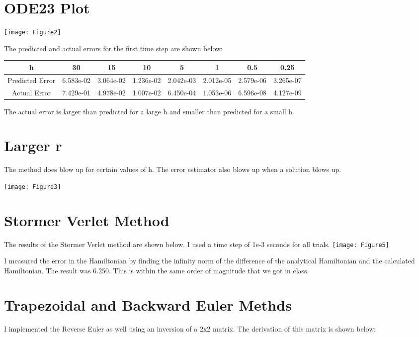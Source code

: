 \documentclass{article}
\begin{document}
\section{ODE23 Plot}

\texttt{[image: Figure2]}

The predicted and actual errors for the first time step are shown below:

\begin{center}
\begin{tabular}{c|c|c|c|c|c|c|c}
 h &  30& 15& 10& 5& 1& 0.5& 0.25\\ \hline
Predicted Error & 6.583e-02& 3.064e-02& 1.236e-02& 2.042e-03& 2.012e-05& 2.579e-06& 3.265e-07\\
Actual Error &7.429e-01& 4.978e-02& 1.007e-02& 6.450e-04& 1.053e-06& 6.596e-08& 4.127e-09
\end{tabular}
\end{center}

The actual error is larger than predicted for a large h and smaller than predicted for a small h.

\section{Larger r}


The method does blow up for certain values of h. The error estimator also blows up when a solution blows up.

\texttt{[image: Figure3]}

\section{Stormer Verlet Method}

The results of the Stormer Verlet method are shown below. I used a time step of 1e-3 seconds for all trials.
\texttt{[image: Figure5]}

I measured the error in the Hamiltonian by finding the infinity norm of the difference of the analytical Hamiltonian and the calculated Hamiltonian. The result was 6.250. This is within the same order of magnitude that we got in class.

\section{Trapezoidal and Backward Euler Methds}


I implemented the Reverse Euler as well using an inversion of a 2x2 matrix. The derivation of this matrix is shown below:
\end{document}
